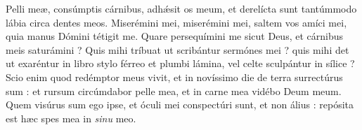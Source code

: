 \lettrine{P}{}elli meæ, consúmptis cárnibus, adhǽsit os meum, et derelícta sunt tantúmmodo lábia circa dentes meos.
Miserémini mei, miserémini mei, saltem vos amíci mei, quia manus Dómini tétigit me.
Quare persequímini me sicut Deus, et cárnibus meis saturámini ?
Quis mihi tríbuat ut scribántur sermónes mei ? quis mihi det ut exaréntur in libro
stylo férreo et plumbi lámina, vel celte sculpántur in sílice ?
Scio enim quod redémptor meus vivit, et in novíssimo die de terra surrectúrus sum :
et rursum circúmdabor pelle mea, et in carne mea vidébo Deum meum.
Quem visúrus sum ego ipse, et óculi mei conspectúri sunt, et non álius : repósita est hæc spes mea in \textit{sinu} meo.